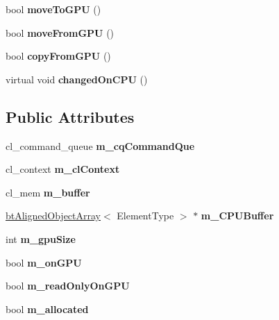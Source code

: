 \begin{DoxyCompactItemize}
bool {\bfseries move\+To\+G\+PU} ()
\item 
\mbox{\label{classbtOpenCLBuffer_a6555ee5c3a3d6e6d638590923cf9cbbf}} 
bool {\bfseries move\+From\+G\+PU} ()
\item 
\mbox{\label{classbtOpenCLBuffer_a88a86a86827389c4b9dcd2e2ff441875}} 
bool {\bfseries copy\+From\+G\+PU} ()
\item 
\mbox{\label{classbtOpenCLBuffer_a2eda55c719099ee8751625283e47b638}} 
virtual void {\bfseries changed\+On\+C\+PU} ()
\end{DoxyCompactItemize}
\subsection*{Public Attributes}
\begin{DoxyCompactItemize}
\item 
\mbox{\label{classbtOpenCLBuffer_a50902e133ee04c129c737d88e3f04c34}} 
cl\+\_\+command\+\_\+queue {\bfseries m\+\_\+cq\+Command\+Que}
\item 
\mbox{\label{classbtOpenCLBuffer_a39873214f4129017d2c175241f7786e7}} 
cl\+\_\+context {\bfseries m\+\_\+cl\+Context}
\item 
\mbox{\label{classbtOpenCLBuffer_a5de1367b9257357561c7e82376d741e5}} 
cl\+\_\+mem {\bfseries m\+\_\+buffer}
\item 
\mbox{\label{classbtOpenCLBuffer_a7be749d2909e8a87c4b57622ab82d77f}} 
\hyperlink{classbtAlignedObjectArray}{bt\+Aligned\+Object\+Array}$<$ Element\+Type $>$ $\ast$ {\bfseries m\+\_\+\+C\+P\+U\+Buffer}
\item 
\mbox{\label{classbtOpenCLBuffer_a46043d658e27e6ab76e7adb4011fc0f2}} 
int {\bfseries m\+\_\+gpu\+Size}
\item 
\mbox{\label{classbtOpenCLBuffer_abf0b3c59fbbf54fdb5650bb15ff90289}} 
bool {\bfseries m\+\_\+on\+G\+PU}
\item 
\mbox{\label{classbtOpenCLBuffer_aed34ffe5f6ebffee05b4ac7a0a64b892}} 
bool {\bfseries m\+\_\+read\+Only\+On\+G\+PU}
\item 
\mbox{\label{classbtOpenCLBuffer_abbe8e30713416b5b62a30b37dbb9cf68}} 
bool {\bfseries m\+\_\+allocated}
\end{DoxyCompactItemize}


